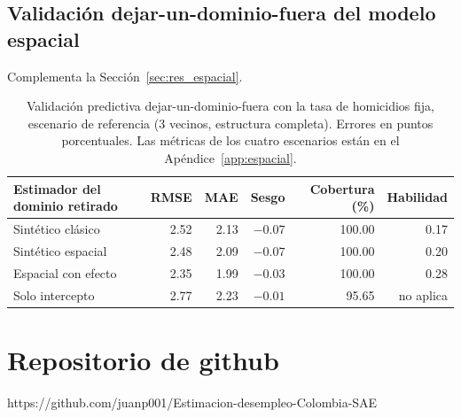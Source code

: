 \subsection{Validación dejar-un-dominio-fuera del modelo espacial}

Complementa la Sección~\ref{sec:res_espacial}.

\begin{table}[!htbp]
\centering
\small
\caption{Validación predictiva dejar-un-dominio-fuera con la tasa de homicidios fija, escenario de referencia (3 vecinos, estructura completa). Errores en puntos porcentuales. Las métricas de los cuatro escenarios están en el Apéndice~\ref{app:espacial}.}
\label{tab:res_validacion_espacial}
\begin{tabular}{l r r r r r}
\toprule
Estimador del dominio retirado & RMSE & MAE & Sesgo & Cobertura (\%) & Habilidad \\
\midrule
Sintético clásico & 2.52 & 2.13 & $-0.07$ & 100.00 & 0.17 \\
Sintético espacial & 2.48 & 2.09 & $-0.07$ & 100.00 & 0.20 \\
Espacial con efecto & 2.35 & 1.99 & $-0.03$ & 100.00 & 0.28 \\
Solo intercepto & 2.77 & 2.23 & $-0.01$ & 95.65 & no aplica \\
\bottomrule
\end{tabular}
\end{table}

\FloatBarrier

\section{Repositorio de github}
\label{sec:repositorio-github}

https://github.com/juanp001/Estimacion-desempleo-Colombia-SAE

